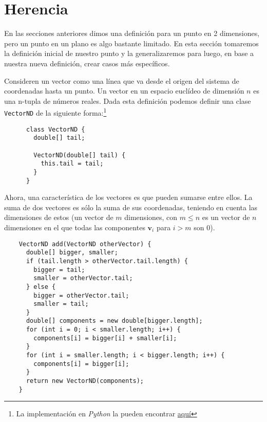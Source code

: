 \section{Herencia}

  En las secciones anteriores dimos una definición para un punto en 2 dimensiones, pero un 
  punto en un plano es algo bastante limitado.
  En esta sección tomaremos la definición inicial de nuestro punto y la generalizaremos 
  para luego, en base a nuestra nueva definición, crear casos más específicos.

  Consideren un vector como una línea que va desde el origen del sistema de coordenadas 
  hasta un punto.
  Un vector en un espacio euclídeo de dimensión \(n\) es una n-tupla de números reales.
  Dada esta definición podemos definir una clase \texttt{VectorND} de la siguiente 
  forma:\footnote{
    La implementación en \textit{Python} la pueden encontrar 
    \href{https://github.com/CC3002-Metodologias/apunte-y-ejercicios/blob/master/src/main/python/vectors.py}{aquí}
  }
  
  \begin{listing}[ht!]
    \begin{verbatim}
      class VectorND {
        double[] tail;
        
        VectorND(double[] tail) {
          this.tail = tail;
        }
      }
    \end{verbatim}
  \end{listing}

  Ahora, una característica de los vectores es que pueden sumarse entre ellos.
  La suma de dos vectores es sólo la suma de sus coordenadas, teniendo en cuenta las 
  dimensiones de estos (un vector de \(m\) dimensiones, con \(m \leq n\) es un vector de 
  \(n\) dimensiones en el que todas las componentes \(\mathbf{v}_i\) para \(i > m\) son 
  0).

  \begin{verbatim}
    VectorND add(VectorND otherVector) {
      double[] bigger, smaller;
      if (tail.length > otherVector.tail.length) {
        bigger = tail;
        smaller = otherVector.tail;
      } else {
        bigger = otherVector.tail;
        smaller = tail;
      }
      double[] components = new double[bigger.length];
      for (int i = 0; i < smaller.length; i++) {
        components[i] = bigger[i] + smaller[i];
      }
      for (int i = smaller.length; i < bigger.length; i++) {
        components[i] = bigger[i];
      }
      return new VectorND(components);
    }
  \end{verbatim}

